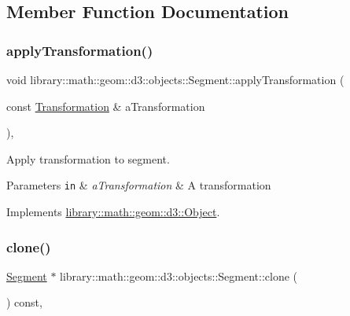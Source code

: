 \subsection{Member Function Documentation}
\mbox{\label{classlibrary_1_1math_1_1geom_1_1d3_1_1objects_1_1_segment_a63c7017391bcc0e67f4d97311e7ebdb2}} 
\subsubsection{\texorpdfstring{apply\+Transformation()}{applyTransformation()}}
{\footnotesize\ttfamily void library\+::math\+::geom\+::d3\+::objects\+::\+Segment\+::apply\+Transformation (\begin{DoxyParamCaption}\item[{const \hyperlink{classlibrary_1_1math_1_1geom_1_1d3_1_1_transformation}{Transformation} \&}]{a\+Transformation }\end{DoxyParamCaption})\hspace{0.3cm}{\ttfamily [override]}, {\ttfamily [virtual]}}



Apply transformation to segment. 


\begin{DoxyParams}[1]{Parameters}
\mbox{\tt in}  & {\em a\+Transformation} & A transformation \\
\hline
\end{DoxyParams}


Implements \hyperlink{classlibrary_1_1math_1_1geom_1_1d3_1_1_object_a5fc47b1ee5d9a28efc6010d3d1512470}{library\+::math\+::geom\+::d3\+::\+Object}.

\mbox{\label{classlibrary_1_1math_1_1geom_1_1d3_1_1objects_1_1_segment_a589ad56339616f362cee84a2ecab61a4}} 
\subsubsection{\texorpdfstring{clone()}{clone()}}
{\footnotesize\ttfamily \hyperlink{classlibrary_1_1math_1_1geom_1_1d3_1_1objects_1_1_segment}{Segment} $\ast$ library\+::math\+::geom\+::d3\+::objects\+::\+Segment\+::clone (\begin{DoxyParamCaption}{ }\end{DoxyParamCaption}) const\hspace{0.3cm}{\ttfamily [override]}, {\ttfamily [virtual]}}




